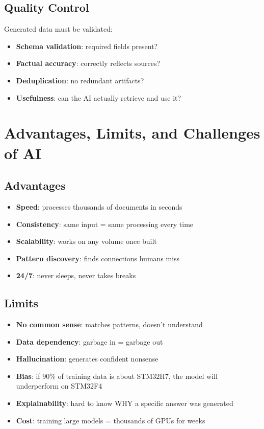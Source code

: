 \documentclass[11pt,a4paper]{report}
\begin{document}
\section{Quality Control}

Generated data must be validated:
\begin{itemize}
    \item \textbf{Schema validation}: required fields present?
    \item \textbf{Factual accuracy}: correctly reflects sources?
    \item \textbf{Deduplication}: no redundant artifacts?
    \item \textbf{Usefulness}: can the AI actually retrieve and use it?
\end{itemize}

\chapter{Advantages, Limits, and Challenges of AI}

\section{Advantages}

\begin{itemize}
    \item \textbf{Speed}: processes thousands of documents in seconds
    \item \textbf{Consistency}: same input = same processing every time
    \item \textbf{Scalability}: works on any volume once built
    \item \textbf{Pattern discovery}: finds connections humans miss
    \item \textbf{24/7}: never sleeps, never takes breaks
\end{itemize}

\section{Limits}

\begin{itemize}
    \item \textbf{No common sense}: matches patterns, doesn't understand
    \item \textbf{Data dependency}: garbage in = garbage out
    \item \textbf{Hallucination}: generates confident nonsense
    \item \textbf{Bias}: if 90\% of training data is about STM32H7, the model will underperform on STM32F4
    \item \textbf{Explainability}: hard to know WHY a specific answer was generated
    \item \textbf{Cost}: training large models = thousands of GPUs for weeks
\end{itemize}
\end{document}
